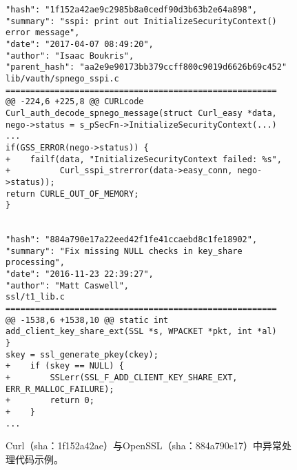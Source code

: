 \begin{figure}[b]
	\centering
\begin{lstlisting}
"hash": "1f152a42ae9c2985b8a0cedf90d3b63b2e64a898",
"summary": "sspi: print out InitializeSecurityContext() error message",
"date": "2017-04-07 08:49:20",
"author": "Isaac Boukris",
"parent_hash": "aa2e9e90173bb379ccff800c9019d6626b69c452"
lib/vauth/spnego_sspi.c
=======================================================
@@ -224,6 +225,8 @@ CURLcode Curl_auth_decode_spnego_message(struct Curl_easy *data,
nego->status = s_pSecFn->InitializeSecurityContext(...)
...
if(GSS_ERROR(nego->status)) {
+    failf(data, "InitializeSecurityContext failed: %s",
+          Curl_sspi_strerror(data->easy_conn, nego->status));
return CURLE_OUT_OF_MEMORY;
}


"hash": "884a790e17a22eed42f1fe41ccaebd8c1fe18902",
"summary": "Fix missing NULL checks in key_share processing",
"date": "2016-11-23 22:39:27",
"author": "Matt Caswell",
ssl/t1_lib.c
=======================================================
@@ -1538,6 +1538,10 @@ static int add_client_key_share_ext(SSL *s, WPACKET *pkt, int *al)
}
skey = ssl_generate_pkey(ckey);
+    if (skey == NULL) {
+        SSLerr(SSL_F_ADD_CLIENT_KEY_SHARE_EXT, ERR_R_MALLOC_FAILURE);
+        return 0;
+    }
...
\end{lstlisting}
	\caption{
	Curl（sha：1f152a42ae）与OpenSSL（sha：884a790e17）中异常处理代码示例。
	}
	\label{fig:2-3-ieh-3}
\end{figure}